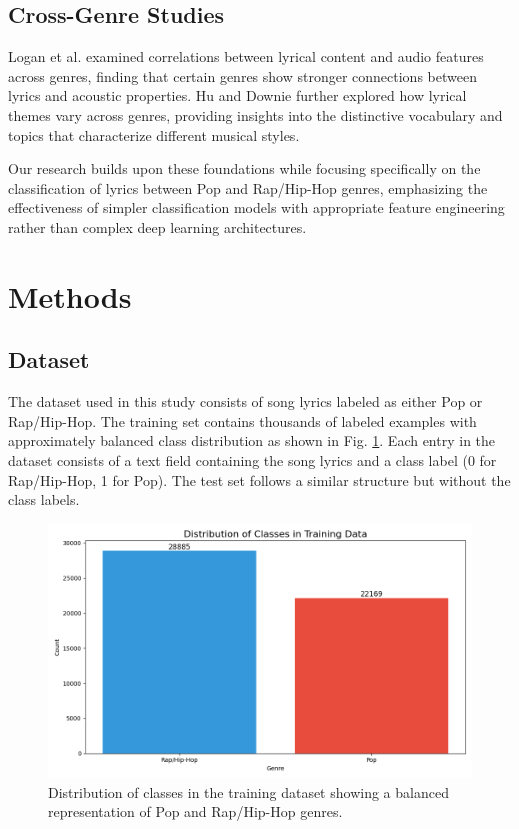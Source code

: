 \documentclass[conference]{IEEEtran}
\begin{document}
\subsection{Cross-Genre Studies}
Logan et al. \cite{logan2004semantic} examined correlations between lyrical content and audio features across genres, finding that certain genres show stronger connections between lyrics and acoustic properties. Hu and Downie \cite{hu2010improving} further explored how lyrical themes vary across genres, providing insights into the distinctive vocabulary and topics that characterize different musical styles.

Our research builds upon these foundations while focusing specifically on the classification of lyrics between Pop and Rap/Hip-Hop genres, emphasizing the effectiveness of simpler classification models with appropriate feature engineering rather than complex deep learning architectures.

\section{Methods}
\subsection{Dataset}
The dataset used in this study consists of song lyrics labeled as either Pop or Rap/Hip-Hop. The training set contains thousands of labeled examples with approximately balanced class distribution as shown in Fig. \ref{fig:class_dist}. Each entry in the dataset consists of a text field containing the song lyrics and a class label (0 for Rap/Hip-Hop, 1 for Pop). The test set follows a similar structure but without the class labels.

\begin{figure}[htbp]
\centerline{\includegraphics[width=0.9\columnwidth]{plots/svm_class_distribution.png}}
\caption{Distribution of classes in the training dataset showing a balanced representation of Pop and Rap/Hip-Hop genres.}
\label{fig:class_dist}
\end{figure}
\end{document}
